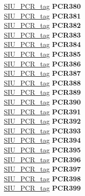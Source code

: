 \begin{DoxyCompactItemize}
\begin{tabbing}
\>\>\mbox{\hyperlink{unionSIU__tag_1_1SIU__PCR__tag}{SIU\_PCR\_tag}} {\bfseries PCR380}\\
\>\>\mbox{\hyperlink{unionSIU__tag_1_1SIU__PCR__tag}{SIU\_PCR\_tag}} {\bfseries PCR381}\\
\>\>\mbox{\hyperlink{unionSIU__tag_1_1SIU__PCR__tag}{SIU\_PCR\_tag}} {\bfseries PCR382}\\
\>\>\mbox{\hyperlink{unionSIU__tag_1_1SIU__PCR__tag}{SIU\_PCR\_tag}} {\bfseries PCR383}\\
\>\>\mbox{\hyperlink{unionSIU__tag_1_1SIU__PCR__tag}{SIU\_PCR\_tag}} {\bfseries PCR384}\\
\>\>\mbox{\hyperlink{unionSIU__tag_1_1SIU__PCR__tag}{SIU\_PCR\_tag}} {\bfseries PCR385}\\
\>\>\mbox{\hyperlink{unionSIU__tag_1_1SIU__PCR__tag}{SIU\_PCR\_tag}} {\bfseries PCR386}\\
\>\>\mbox{\hyperlink{unionSIU__tag_1_1SIU__PCR__tag}{SIU\_PCR\_tag}} {\bfseries PCR387}\\
\>\>\mbox{\hyperlink{unionSIU__tag_1_1SIU__PCR__tag}{SIU\_PCR\_tag}} {\bfseries PCR388}\\
\>\>\mbox{\hyperlink{unionSIU__tag_1_1SIU__PCR__tag}{SIU\_PCR\_tag}} {\bfseries PCR389}\\
\>\>\mbox{\hyperlink{unionSIU__tag_1_1SIU__PCR__tag}{SIU\_PCR\_tag}} {\bfseries PCR390}\\
\>\>\mbox{\hyperlink{unionSIU__tag_1_1SIU__PCR__tag}{SIU\_PCR\_tag}} {\bfseries PCR391}\\
\>\>\mbox{\hyperlink{unionSIU__tag_1_1SIU__PCR__tag}{SIU\_PCR\_tag}} {\bfseries PCR392}\\
\>\>\mbox{\hyperlink{unionSIU__tag_1_1SIU__PCR__tag}{SIU\_PCR\_tag}} {\bfseries PCR393}\\
\>\>\mbox{\hyperlink{unionSIU__tag_1_1SIU__PCR__tag}{SIU\_PCR\_tag}} {\bfseries PCR394}\\
\>\>\mbox{\hyperlink{unionSIU__tag_1_1SIU__PCR__tag}{SIU\_PCR\_tag}} {\bfseries PCR395}\\
\>\>\mbox{\hyperlink{unionSIU__tag_1_1SIU__PCR__tag}{SIU\_PCR\_tag}} {\bfseries PCR396}\\
\>\>\mbox{\hyperlink{unionSIU__tag_1_1SIU__PCR__tag}{SIU\_PCR\_tag}} {\bfseries PCR397}\\
\>\>\mbox{\hyperlink{unionSIU__tag_1_1SIU__PCR__tag}{SIU\_PCR\_tag}} {\bfseries PCR398}\\
\>\>\mbox{\hyperlink{unionSIU__tag_1_1SIU__PCR__tag}{SIU\_PCR\_tag}} {\bfseries PCR399}\\

\end{tabbing}
\end{DoxyCompactItemize}
